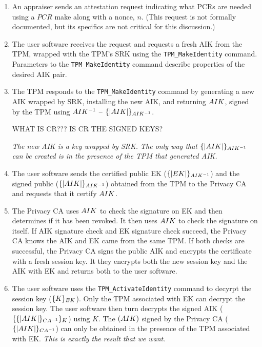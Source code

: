 \documentclass[10pt]{article}
\begin{document}
\begin{enumerate}
  \parskip=0pt\itemsep=0pt
\item An appraiser sends an attestation request indicating what PCRs
  are needed using a $PCR$ make along with a nonce, $n$.  (This request
  is not formally documented, but its specifics are not critical for
  this discussion.)

\item The user software receives the request and requests a fresh AIK
  from the TPM, wrapped with the TPM's SRK using the
  \verb+TPM_MakeIdentity+ command.  Parameters to the
  \verb+TPM_MakeIdentity+ command describe properties of the desired
  AIK pair.

\item The TPM responds to the \verb+TPM_MakeIdentity+ command by
  generating a new AIK wrapped by SRK, installing the new AIK, and
  returning $AIK$, signed by the TPM using $AIK^{-1}$ --
  $\{|AIK|\}_{AIK^{-1}}$.

  WHAT IS CR???  IS CR THE SIGNED KEYS?

  \emph{The new AIK is a key wrapped by SRK.  The only way that
    $\{|AIK|\}_{AIK^{-1}}$ can be created is in the presence of
    the TPM that generated AIK.}

\item The user software sends the certified public EK
  ($\{|EK|\}_{AIK^{-1}}$) and the signed public 
  ($\{|AIK|\}_{AIK^{-1}}$) obtained from the TPM to the Privacy CA and
  requests that it certify $AIK$.

\item The Privacy CA uses $AIK$ to check the signature on EK
  and then determines if it has been revoked.  It then uses
  $AIK$ to check the signature on itself.  If AIK signature
  check and EK signature check succeed, the Privacy CA knows the AIK
  and EK came from the same TPM.  If both checks are successful, the
  Privacy CA signs the public AIK and encrypts the certificate with a
  fresh session key.  It they encrypts both the new session key and
  the AIK with EK and returns both to the user software.

\item The user software uses the \verb+TPM_ActivateIdentity+ command
  to decyrpt the session key ($\{K\}_{EK}$).  Only the TPM
  associated with EK can decrypt the session key.  The user software
  then turn decrypts the signed AIK ($\{\{|AIK|\}_{CA^{-1}}\}_{K}$)
  using $K$.  The $(AIK)$ signed by the Privacy CA
  ($\{|AIK|\}_{CA^{-1}}$) can only be obtained in the presence of
  the TPM associated with EK.  \emph{This is exactly the result that
    we want}.


\end{enumerate}
\end{document}
